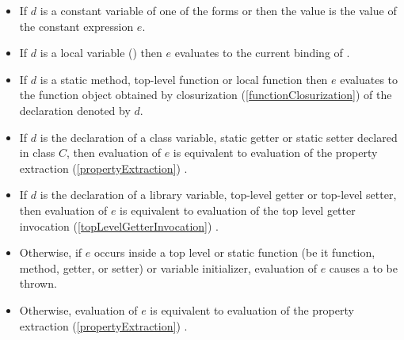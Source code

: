 \documentclass[makeidx]{article}
\begin{document}
\begin{itemize}
\item If $d$ is a constant variable of one of the forms  or  then the value \id{} is the value of the constant expression $e$.
\item If $d$ is a local variable () then $e$ evaluates to the current binding of \id.
\item If $d$ is a static method, top-level function or local function then $e$ evaluates to the function object obtained by closurization (\ref{functionClosurization}) of the declaration denoted by $d$.
\item If $d$ is the declaration of a class variable, static getter or static setter declared in class $C$, then evaluation of $e$ is equivalent to evaluation of the property extraction (\ref{propertyExtraction}) .
\item If $d$ is the declaration of a library variable, top-level getter or top-level setter, then evaluation of $e$ is equivalent to evaluation of the top level getter invocation (\ref{topLevelGetterInvocation}) \id.
\item Otherwise, if $e$ occurs inside a top level or static function (be it function, method, getter, or setter) or variable initializer, evaluation of $e$ causes a  to be thrown.
\item Otherwise, evaluation of $e$ is equivalent to evaluation of the property extraction (\ref{propertyExtraction}) .
\end{itemize}
\end{document}
